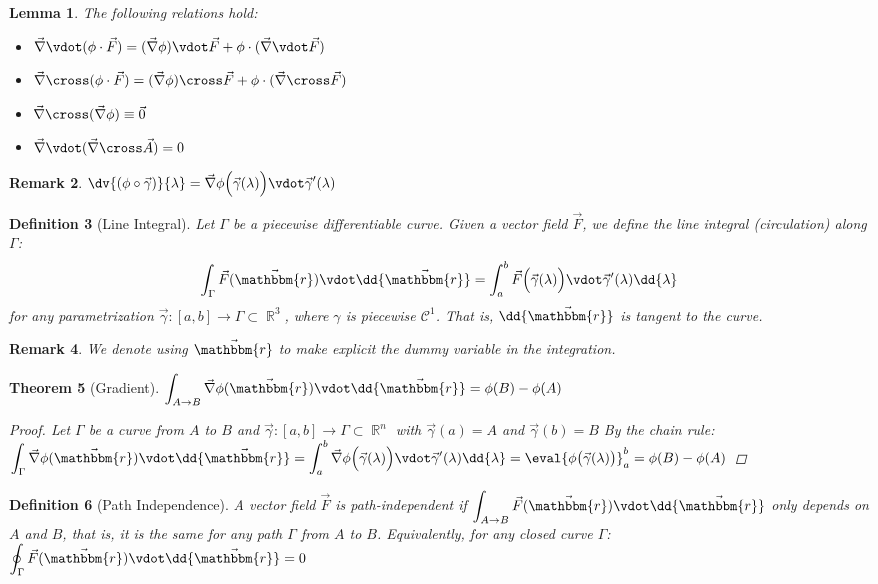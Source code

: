 \documentclass[12pt]{article}
\renewcommand{\grad}{\vec{\nabla}}
\renewcommand{\div}{\vec{\nabla}\vdot}
\renewcommand{\curl}{\vec{\nabla}\cross}
\DeclareMathOperator{\R}{\mathbb{R}}
\newcommand*{\vF}{\vec{F}}
\newcommand*{\gv}{\vec{\gamma}}
\newcommand*{\irv}{\vec{\mathbbm{r}}}
\newtheorem{theorem}{Theorem}[subsection]
\newtheorem{definition}[theorem]{Definition}
\newtheorem{lemma}[theorem]{Lemma}
\newtheorem{remark}[theorem]{Remark}
\begin{document}
\begin{lemma}
  \label{vect_identities}
  The following relations hold:
  \begin{itemize}
    \item $\div(\phi\cdot\vF)=(\grad\phi)\vdot\vF+\phi\cdot(\div\vF)$
    \item $\curl(\phi\cdot\vF)=(\grad\phi)\cross\vF+\phi\cdot(\curl\vF)$
    \item $\curl(\grad\phi)\equiv\vec{0}$
    \item $\div(\curl\vec{A})=0$
  \end{itemize}
\end{lemma}

\begin{remark}
  $\displaystyle \dv{(\phi\circ\gv)}{\lambda}=\grad\phi\Big(\gv(\lambda)\Big)\vdot\gv'(\lambda)$
\end{remark}

\begin{definition}[Line Integral]
  Let $\Gamma$ be a piecewise differentiable curve. Given a vector field $\vF$, we define the line integral (circulation) along $\Gamma$:
  $$\int_\Gamma \vF(\irv)\vdot \dd{\irv}=\int_a^b \vF\Big(\gv(\lambda)\Big)\vdot\gv'(\lambda)\dd{\lambda}$$
  for any parametrization $\gv:[a,b]\to \Gamma\subset\R^3$, where $\gamma$ is piecewise $\mathcal{C}^1$. That is, $\dd{\irv}$ is tangent to the curve.
\end{definition}

\begin{remark}
  We denote using $\irv$ to make explicit the dummy variable in the integration.
\end{remark}

\begin{theorem}[Gradient]
    $\displaystyle \int_{A\to B}\grad\phi(\irv)\vdot \dd{\irv}=\phi(B)-\phi(A)$
  \begin{proof}
    Let $\Gamma$ be a curve from $A$ to $B$ and $\gv:[a,b]\to\Gamma \subset\R^n$ with $\gv(a)=A$ and $\gv(b)=B$
    By the chain rule: $\displaystyle \int_\Gamma \grad\phi(\irv)\vdot \dd{\irv}=\int_a^b \grad\phi\Big(\gv(\lambda)\Big)\vdot\gv'(\lambda)\dd{\lambda}=\eval{\phi\big(\gv(\lambda)\big)}_a^b=\phi(B)-\phi(A)$
  \end{proof}
\end{theorem}

\begin{definition}[Path Independence]
  A vector field $\vF$ is path-independent if $\displaystyle \int_{A\to B} \vF(\irv)\vdot\dd{\irv}$ only depends on $A$ and $B$, that is, it is the same for any path $\Gamma$ from $A$ to $B$. Equivalently, for any closed curve $\Gamma$: $\displaystyle\oint_\Gamma \vF(\irv)\vdot\dd{\irv}=0$
\end{definition}
\end{document}
